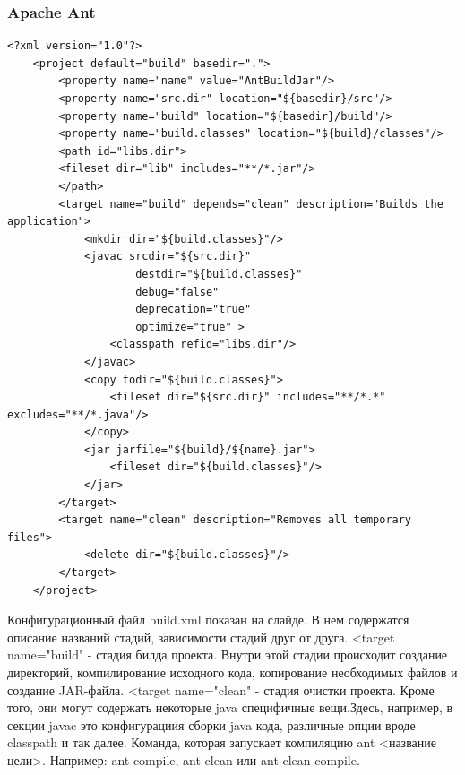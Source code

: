 \documentclass{../industrial-development}
\begin{document}
\begin{frame}[fragile] \frametitle{Apache Ant}
	\begin{lstlisting}[label=some-code,caption=build.xml]
	<?xml version="1.0"?>
	<project default="build" basedir=".">
		<property name="name" value="AntBuildJar"/>
		<property name="src.dir" location="${basedir}/src"/>
		<property name="build" location="${basedir}/build"/>
		<property name="build.classes" location="${build}/classes"/>
		<path id="libs.dir">
		<fileset dir="lib" includes="**/*.jar"/>
		</path>
		<target name="build" depends="clean" description="Builds the application">
			<mkdir dir="${build.classes}"/>
			<javac srcdir="${src.dir}"
					destdir="${build.classes}"
					debug="false"
					deprecation="true"
					optimize="true" >
				<classpath refid="libs.dir"/>
			</javac>
			<copy todir="${build.classes}">
				<fileset dir="${src.dir}" includes="**/*.*" excludes="**/*.java"/>
			</copy>
			<jar jarfile="${build}/${name}.jar">
				<fileset dir="${build.classes}"/>
			</jar>
		</target>	
		<target name="clean" description="Removes all temporary files">
			<delete dir="${build.classes}"/>
		</target>
	</project>
	\end{lstlisting}
\end{frame}
\lecturenotes
Конфигурационный файл build.xml показан на слайде. В нем содержатся описание названий стадий, зависимости стадий друг от друга.
<target name="build" - стадия билда проекта. Внутри этой стадии происходит создание директорий, компилирование исходного кода, копирование необходимых файлов и создание JAR-файла.
<target name="clean" - стадия очистки проекта.
Кроме того, они могут содержать некоторые java специфичные вещи.Здесь, например, в секции javac это конфигурациия сборки java кода, различные опции вроде classpath и так далее. Команда, которая запускает компиляцию ant <название цели>. Например: ant compile, ant clean или ant clean compile.
~\cite{Yandex_Build_Automation}
\end{document}
